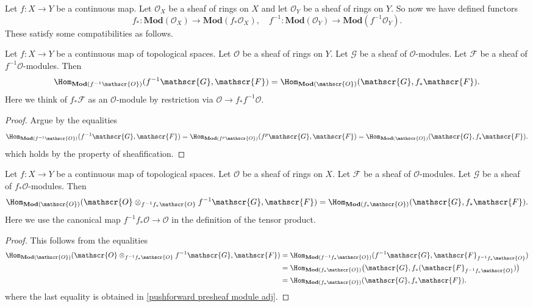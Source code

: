 Let $f:X\to Y$ be a continuous map. Let $\mathscr{O}_X$ be a sheaf of rings on $X$ and let $\mathscr{O}_Y$ be a sheaf of rings on $Y$. So now we have defined functors
\[f_*:\mathbf{Mod}(\mathscr{O}_X)\to\mathbf{Mod}(f_*\mathscr{O}_X),\quad f^{-1}:\mathbf{Mod}(\mathscr{O}_Y)\to\mathbf{Mod}(f^{-1}\mathscr{O}_Y).\]
These satisfy some compatibilities as follows.
\begin{proposition}\label{pull back module sheaf adj}
Let $f:X\to Y$ be a continuous map of topological spaces. Let $\mathscr{O}$ be a sheaf of rings on $Y$. Let $\mathscr{G}$ be a sheaf of $\mathscr{O}$-modules. Let $\mathscr{F}$ be a sheaf of $f^{-1}\mathscr{O}$-modules. Then
\[\Hom_{\mathbf{Mod}(f^{-1}\mathscr{O})}(f^{-1}\mathscr{G},\mathscr{F})=\Hom_{\mathbf{Mod}(\mathscr{O})}(\mathscr{G},f_*\mathscr{F}).\]
Here we think of $f_*\mathscr{F}$ as an $\mathscr{O}$-module by restriction via $\mathscr{O}\to f_*f^{-1}\mathscr{O}$.
\end{proposition}
\begin{proof}
Argue by the equalities
\[\Hom_{\mathbf{Mod}(f^{-1}\mathscr{O})}(f^{-1}\mathscr{G},\mathscr{F})=\Hom_{\mathbf{Mod}(f^{p}\mathscr{O})}(f^{p}\mathscr{G},\mathscr{F})=\Hom_{\mathbf{Mod}(\mathscr{O})}(\mathscr{G},f_*\mathscr{F}).\]
which holds by the property of sheafification.
\end{proof}
\begin{proposition}\label{push module sheaf adj}
Let $f:X\to Y$ be a continuous map of topological spaces. Let $\mathscr{O}$ be a sheaf of rings on $X$. Let $\mathscr{F}$ be a sheaf of $\mathscr{O}$-modules. Let $\mathscr{G}$ be a sheaf of $f_*\mathscr{O}$-modules. Then
\[\Hom_{\mathbf{Mod}(\mathscr{O})}(\mathscr{O}\otimes_{f^{-1}f_*\mathscr{O}}f^{-1}\mathscr{G},\mathscr{F})=\Hom_{\mathbf{Mod}(f_*\mathscr{O})}(\mathscr{G},f_*\mathscr{F}).\]
Here we use the canonical map $f^{-1}f_*\mathscr{O}\to\mathscr{O}$ in the definition of the tensor product.
\end{proposition}
\begin{proof}
This follows from the equalities
\begin{align*}
\Hom_{\mathbf{Mod}(\mathscr{O})}(\mathscr{O}\otimes_{f^{-1}f_*\mathscr{O}}f^{-1}\mathscr{G},\mathscr{F})&=\Hom_{\mathbf{Mod}(f^{-1}f_*\mathscr{O})}(f^{-1}\mathscr{G},\mathscr{F}_{f^{-1}f_*\mathscr{O}})\\
&=\Hom_{\mathbf{Mod}(f_*\mathscr{O})}\big(\mathscr{G},f_*(\mathscr{F}_{f^{-1}f_*\mathscr{O}})\big)\\
&=\Hom_{\mathbf{Mod}(f_*\mathscr{O})}(\mathscr{G},f_*\mathscr{F}).
\end{align*}
where the last equality is obtained in \cref{pushforward presheaf module adj}.
\end{proof}
